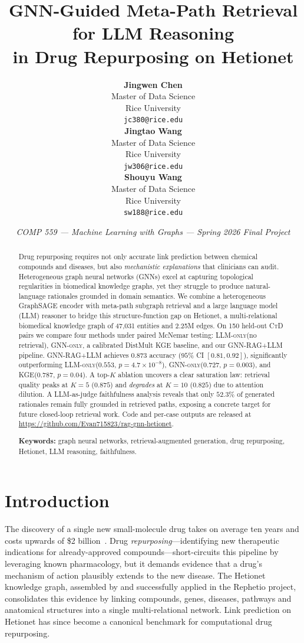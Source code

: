 \documentclass{article}
\title{GNN-Guided Meta-Path Retrieval for LLM Reasoning\\ in Drug Repurposing on Hetionet}
\author{%
  \hfil\begin{tabular}[t]{c}\textbf{Jingwen Chen}\\Master of Data Science\\Rice University\\\texttt{jc380@rice.edu}\end{tabular}\hfil%
  \begin{tabular}[t]{c}\textbf{Jingtao Wang}\\Master of Data Science\\Rice University\\\texttt{jw306@rice.edu}\end{tabular}\hfil%
  \begin{tabular}[t]{c}\textbf{Shouyu Wang}\\Master of Data Science\\Rice University\\\texttt{sw188@rice.edu}\end{tabular}\hfil%
}
\date{\textit{COMP 559 --- Machine Learning with Graphs --- Spring 2026 Final Project}}
\newcommand{\ours}{\textsc{GNN-RAG+LLM}\xspace}
\newcommand{\gnno}{\textsc{GNN-only}\xspace}
\newcommand{\llmo}{\textsc{LLM-only}\xspace}
\newcommand{\kge}{\textsc{KGE}\xspace}
\newcommand{\ctd}{\textsc{CtD}\xspace}
\begin{document}
\maketitle

\begin{abstract}
\noindent Drug repurposing requires not only accurate link prediction between chemical compounds and diseases, but also \emph{mechanistic explanations} that clinicians can audit. Heterogeneous graph neural networks (GNNs) excel at capturing topological regularities in biomedical knowledge graphs, yet they struggle to produce natural-language rationales grounded in domain semantics. We combine a heterogeneous GraphSAGE encoder with meta-path subgraph retrieval and a large language model (LLM) reasoner to bridge this structure-function gap on Hetionet, a multi-relational biomedical knowledge graph of 47{,}031 entities and 2.25M edges. On 150 held-out \ctd pairs we compare four methods under paired McNemar testing: \llmo (no retrieval), \gnno, a calibrated DistMult \kge baseline, and our \ours pipeline. \ours achieves $0.873$ accuracy ($95\%$ CI $[0.81,0.92]$), significantly outperforming \llmo ($0.553$, $p{=}4.7{\times}10^{-8}$), \gnno ($0.727$, $p{=}0.003$), and \kge ($0.787$, $p{=}0.04$). A top-$K$ ablation uncovers a clear saturation law: retrieval quality peaks at $K{=}5$ ($0.875$) and \emph{degrades} at $K{=}10$ ($0.825$) due to attention dilution. A LLM-as-judge faithfulness analysis reveals that only $52.3\%$ of generated rationales remain fully grounded in retrieved paths, exposing a concrete target for future closed-loop retrieval work. Code and per-case outputs are released at \url{https://github.com/Evan715823/rag-gnn-hetionet}.

\vspace{4pt}\noindent\textbf{Keywords:} graph neural networks, retrieval-augmented generation, drug repurposing, Hetionet, LLM reasoning, faithfulness.
\end{abstract}

\section{Introduction}
\label{sec:intro}

The discovery of a single new small-molecule drug takes on average ten years and costs upwards of \$2 billion~\citep{dimasi2016}. Drug \emph{repurposing}---identifying new therapeutic indications for already-approved compounds---short-circuits this pipeline by leveraging known pharmacology, but it demands evidence that a drug's mechanism of action plausibly extends to the new disease. The Hetionet knowledge graph, assembled by \citet{himmelstein2017} and successfully applied in the Rephetio project, consolidates this evidence by linking compounds, genes, diseases, pathways and anatomical structures into a single multi-relational network. Link prediction on Hetionet has since become a canonical benchmark for computational drug repurposing.
\end{document}
